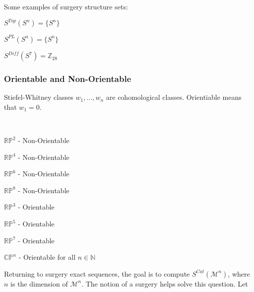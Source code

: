 \documentclass[crop=false,class=book,oneside]{standalone}
\begin{document}
        \begin{example}
            Some examples of surgery structure sets:
            \begin{enumerate}
                \begin{multicols}{3}
                    \item $S^{Top}(S^{n})=\{S^{n}\}$
                    \item $S^{PL}(S^{n})=\{S^{n}\}$
                    \item $S^{Diff}(S^{7})=\mathbb{Z}_{28}$
                \end{multicols}
            \end{enumerate}
        \end{example}
        \subsubsection{Orientable and Non-Orientable}
            Stiefel-Whitney classes $w_{1},\hdots, w_{n}$ are
            cohomological classes.
            Orientiable means that $w_{1}=0$.
            \begin{example}
                \
                \begin{enumerate}
                \end{enumerate}
            \end{example}
            Returning to surgery exact sequences, the goal
            is to compute $S^{Cat}(\mathcal{M}^{n})$, where $n$
            is the dimension of $\mathcal{M}^{n}$. The notion
            of a surgery helps solve this question. Let
\end{document}
